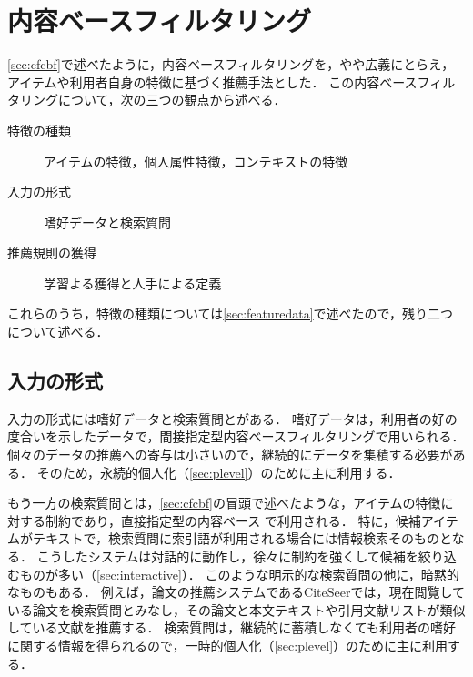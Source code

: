 \chapter{内容ベースフィルタリング}
\label{sec:cbf}

\ref{sec:cfcbf}で述べたように，内容ベースフィルタリングを，やや広義にとらえ，アイテムや利用者自身の特徴に基づく推薦手法とした．
この内容ベースフィルタリングについて，次の三つの観点から述べる．
\begin{description}
 \item[特徴の種類] アイテムの特徴，個人属性特徴，コンテキストの特徴
 \item[入力の形式] 嗜好データと検索質問
 \item[推薦規則の獲得] 学習よる獲得と人手による定義
\end{description}
これらのうち，特徴の種類については\ref{sec:featuredata}で述べたので，残り二つについて述べる．


\section{入力の形式}
\label{sec:cbfinput}

入力の形式には嗜好データと検索質問とがある．
嗜好データは，利用者の好の度合いを示したデータで，間接指定型内容ベースフィルタリング\cite{misc:091,tjsai:05:05,trjsai:06:01}で用いられる．
個々のデータの推薦への寄与は小さいので，継続的にデータを集積する必要がある．
そのため，永続的個人化（\ref{sec:plevel}）のために主に利用する．

もう一方の検索質問とは，\ref{sec:cfcbf}の冒頭で述べたような，アイテムの特徴に対する制約であり，直接指定型の内容ベース
\cite{ec:024,ijcai:03:04,jair:04:01,ieeem:07:06}で利用される．
特に，候補アイテムがテキストで，検索質問に索引語が利用される場合には情報検索\cite{jb:012:00}そのものとなる．
こうしたシステムは対話的に動作し，徐々に制約を強くして候補を絞り込むものが多い（\ref{sec:interactive}）．
このような明示的な検索質問の他に，暗黙的なものもある．
例えば，論文の推薦システムであるCiteSeer\cite{ieeem:99:02}では，現在閲覧している論文を検索質問とみなし，その論文と本文テキストや引用文献リストが類似している文献を推薦する．
検索質問は，継続的に蓄積しなくても利用者の嗜好に関する情報を得られるので，一時的個人化（\ref{sec:plevel}）のために主に利用する．


